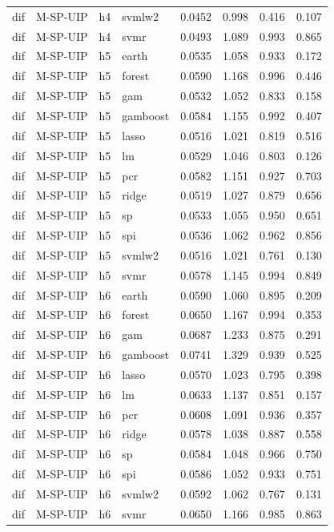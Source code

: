 \begin{ThreePartTable}
\begin{longtable}[t]{llclcccc}
dif & M-SP-UIP & h4 & svmlw2 & 0.0452 & 0.998 & 0.416 & 0.107\\
dif & M-SP-UIP & h4 & svmr & 0.0493 & 1.089 & 0.993 & 0.865\\
\addlinespace
dif & M-SP-UIP & h5 & earth & 0.0535 & 1.058 & 0.933 & 0.172\\
dif & M-SP-UIP & h5 & forest & 0.0590 & 1.168 & 0.996 & 0.446\\
dif & M-SP-UIP & h5 & gam & 0.0532 & 1.052 & 0.833 & 0.158\\
dif & M-SP-UIP & h5 & gamboost & 0.0584 & 1.155 & 0.992 & 0.407\\
dif & M-SP-UIP & h5 & lasso & 0.0516 & 1.021 & 0.819 & 0.516\\
dif & M-SP-UIP & h5 & lm & 0.0529 & 1.046 & 0.803 & 0.126\\
dif & M-SP-UIP & h5 & pcr & 0.0582 & 1.151 & 0.927 & 0.703\\
dif & M-SP-UIP & h5 & ridge & 0.0519 & 1.027 & 0.879 & 0.656\\
dif & M-SP-UIP & h5 & sp & 0.0533 & 1.055 & 0.950 & 0.651\\
dif & M-SP-UIP & h5 & spi & 0.0536 & 1.062 & 0.962 & 0.856\\
dif & M-SP-UIP & h5 & svmlw2 & 0.0516 & 1.021 & 0.761 & 0.130\\
dif & M-SP-UIP & h5 & svmr & 0.0578 & 1.145 & 0.994 & 0.849\\
\addlinespace
dif & M-SP-UIP & h6 & earth & 0.0590 & 1.060 & 0.895 & 0.209\\
dif & M-SP-UIP & h6 & forest & 0.0650 & 1.167 & 0.994 & 0.353\\
dif & M-SP-UIP & h6 & gam & 0.0687 & 1.233 & 0.875 & 0.291\\
dif & M-SP-UIP & h6 & gamboost & 0.0741 & 1.329 & 0.939 & 0.525\\
dif & M-SP-UIP & h6 & lasso & 0.0570 & 1.023 & 0.795 & 0.398\\
dif & M-SP-UIP & h6 & lm & 0.0633 & 1.137 & 0.851 & 0.157\\
dif & M-SP-UIP & h6 & pcr & 0.0608 & 1.091 & 0.936 & 0.357\\
dif & M-SP-UIP & h6 & ridge & 0.0578 & 1.038 & 0.887 & 0.558\\
dif & M-SP-UIP & h6 & sp & 0.0584 & 1.048 & 0.966 & 0.750\\
dif & M-SP-UIP & h6 & spi & 0.0586 & 1.052 & 0.933 & 0.751\\
dif & M-SP-UIP & h6 & svmlw2 & 0.0592 & 1.062 & 0.767 & 0.131\\
dif & M-SP-UIP & h6 & svmr & 0.0650 & 1.166 & 0.985 & 0.863\\

\end{longtable}
\end{ThreePartTable}
